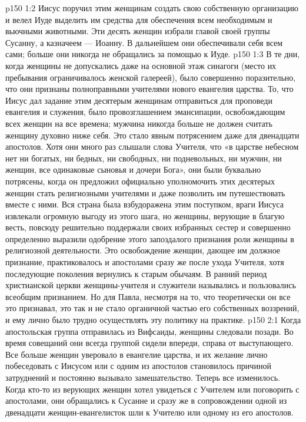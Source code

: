 \vs p150 1:2 Иисус поручил этим женщинам создать свою собственную организацию и велел Иуде выделить им средства для обеспечения всем необходимым и вьючными животными. Эти десять женщин избрали главой своей группы Сусанну, а казначеем --- Иоанну. В дальнейшем они обеспечивали себя всем сами; больше они никогда не обращались за помощью к Иуде.
\vs p150 1:3 В те дни, когда женщины не допускались даже на основной этаж синагоги (место их пребывания ограничивалось женской галереей), было совершенно поразительно, что они признаны полноправными учителями нового евангелия царства. То, что Иисус дал задание этим десятерым женщинам отправиться для проповеди евангелия и служения, было провозглашением эмансипации, освобождающим всех женщин на все времена; мужчина никогда больше не должен считать женщину духовно ниже себя. Это стало явным потрясением даже для двенадцати апостолов. Хотя они много раз слышали слова Учителя, что «в царстве небесном нет ни богатых, ни бедных, ни свободных, ни подневольных, ни мужчин, ни женщин, все одинаковые сыновья и дочери Бога», они были буквально потрясены, когда он предложил официально уполномочить этих десятерых женщин стать религиозными учителями и даже позволить им путешествовать вместе с ними. Вся страна была взбудоражена этим поступком, враги Иисуса извлекали огромную выгоду из этого шага, но женщины, верующие в благую весть, повсюду решительно поддержали своих избранных сестер и совершенно определенно выразили одобрение этого запоздалого признания роли женщины в религиозной деятельности. Это освобождение женщин, дающее им должное признание, практиковалось и апостолами сразу же после ухода Учителя, хотя последующие поколения вернулись к старым обычаям. В ранний период христианской церкви женщины\hyp{}учителя и служители назывались  и пользовались всеобщим признанием. Но для Павла, несмотря на то, что теоретически он все это признавал, это так и не стало органичной частью его собственных воззрений, и ему лично было трудно осуществлять эту политику на практике.
\vs p150 2:1 Когда апостольская группа отправилась из Вифсаиды, женщины следовали позади. Во время совещаний они всегда группой сидели впереди, справа от выступающего. Все больше женщин уверовало в евангелие царства, и их желание лично побеседовать с Иисусом или с одним из апостолов становилось причиной затруднений и постоянно вызывало замешательство. Теперь все изменилось. Когда кто\hyp{}то из верующих женщин хотел увидеться с Учителем или поговорить с апостолами, они обращались к Сусанне и сразу же в сопровождении одной из двенадцати женщин\hyp{}евангелисток шли к Учителю или одному из его апостолов.
